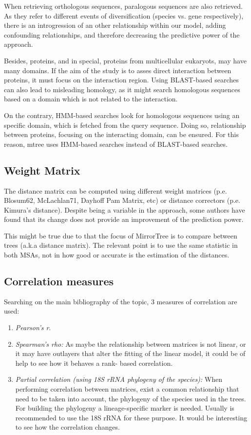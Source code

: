 \documentclass[11pt]{article}
\begin{document}
When retrieving orthologous sequences, paralogous sequences are also retrieved. As they refer to different events of diversification (species vs. gene respectively), there is an introgression of an other relationship within our model, adding confounding relationships, and therefore decreasing the predictive power of the approach.

Besides, proteins, and in special, proteins from multicellular eukaryots, may have many domains. If the aim of the study is to asses direct interaction between proteins, it must focus on the interaction region. Using BLAST-based searches can also lead to misleading homology, as it might search homologous sequences based on a domain which is not related to the interaction.

On the contrary, HMM-based searches look for homologous sequences using an specific domain, which is fetched from the query sequence. Doing so, relationship between proteins, focusing on the interacting domain, can be ensured. For this reason, mtree uses HMM-based searches instead of BLAST-based searches.


\subsection{Weight Matrix}
The distance matrix can be computed using different weight matrices (p.e. Blosum62, McLachlan71, Dayhoff Pam Matrix, etc) or distance correctors (p.e. Kimura's distance). Despite being a variable in the approach, some authors\cite{Zhou13} have found that its change does not provide an improvement of the prediction power.

This might be true due to that the focus of MirrorTree is to compare between trees (a.k.a distance matrix). The relevant point is to use the same statistic in both MSAs, not in how good or accurate is the estimation of the distances.

\subsection{Correlation measures}
Searching on the main bibliography of the topic, 3 measures of correlation are used:

\begin{enumerate}
\setlength{\itemsep}{1pt}
	\item \textit{Pearson's r}\cite{Pazos2001}.
	\item \textit{Spearman's rho:} As maybe the relationship between matrices is not linear, or it may have 		outlayers that alter the fitting of the linear model, it could be of help to see how it behaves a rank-		based correlation.
	\item \textit{Partial correlation (using 18S rRNA phylogeny of the species):}\cite{Sato2005} When 			performing correlation between matrices, exist a common relationship that need to be taken into account, 		the phylogeny of the species used in the trees. For building the phylogeny a lineage-specific marker is 		needed. Usually is recommended to use the 18S rRNA for these purpose\cite{Sato2005}. It would be 				interesting to see how the correlation changes.
\end{enumerate}
\end{document}

